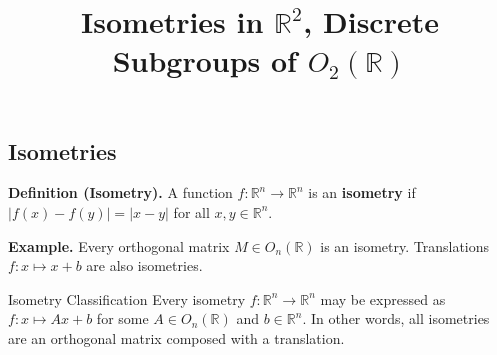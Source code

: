 \title{Isometries in $\mathbb{R}^2$, Discrete Subgroups of $O_2(\mathbb{R})$}



\subsection{Isometries}

\textbf{Definition (Isometry).} A function $f: \mathbb{R}^n \to \mathbb{R}^n$ is an \textbf{isometry} if $|f(x) - f(y)| = |x - y|$ for all $x, y \in \mathbb{R}^n$.

\textbf{Example.} Every orthogonal matrix $M \in O_n(\mathbb{R})$ is an isometry.  Translations $f: x \mapsto x + b$ are also isometries.

\begin{theorem}{Isometry Classification}
    Every isometry $f: \mathbb{R}^n \to \mathbb{R}^n$ may be expressed as $f: x \mapsto Ax + b$ for some $A \in O_n(\mathbb{R})$ and $b \in \mathbb{R}^n$.  In other words, all isometries are an orthogonal matrix composed with a translation.
\end{theorem}

